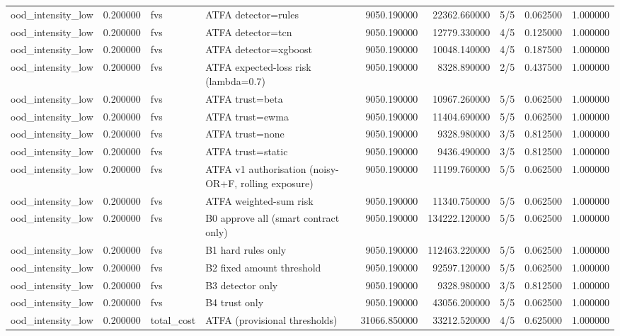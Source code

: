 \begin{tabular}{lrllrrlrr}
ood\_intensity\_low & 0.200000 & fvs & ATFA detector=rules & 9050.190000 & 22362.660000 & 5/5 & 0.062500 & 1.000000 \\
ood\_intensity\_low & 0.200000 & fvs & ATFA detector=tcn & 9050.190000 & 12779.330000 & 4/5 & 0.125000 & 1.000000 \\
ood\_intensity\_low & 0.200000 & fvs & ATFA detector=xgboost & 9050.190000 & 10048.140000 & 4/5 & 0.187500 & 1.000000 \\
ood\_intensity\_low & 0.200000 & fvs & ATFA expected-loss risk (lambda=0.7) & 9050.190000 & 8328.890000 & 2/5 & 0.437500 & 1.000000 \\
ood\_intensity\_low & 0.200000 & fvs & ATFA trust=beta & 9050.190000 & 10967.260000 & 5/5 & 0.062500 & 1.000000 \\
ood\_intensity\_low & 0.200000 & fvs & ATFA trust=ewma & 9050.190000 & 11404.690000 & 5/5 & 0.062500 & 1.000000 \\
ood\_intensity\_low & 0.200000 & fvs & ATFA trust=none & 9050.190000 & 9328.980000 & 3/5 & 0.812500 & 1.000000 \\
ood\_intensity\_low & 0.200000 & fvs & ATFA trust=static & 9050.190000 & 9436.490000 & 3/5 & 0.812500 & 1.000000 \\
ood\_intensity\_low & 0.200000 & fvs & ATFA v1 authorisation (noisy-OR+F, rolling exposure) & 9050.190000 & 11199.760000 & 5/5 & 0.062500 & 1.000000 \\
ood\_intensity\_low & 0.200000 & fvs & ATFA weighted-sum risk & 9050.190000 & 11340.750000 & 5/5 & 0.062500 & 1.000000 \\
ood\_intensity\_low & 0.200000 & fvs & B0 approve all (smart contract only) & 9050.190000 & 134222.120000 & 5/5 & 0.062500 & 1.000000 \\
ood\_intensity\_low & 0.200000 & fvs & B1 hard rules only & 9050.190000 & 112463.220000 & 5/5 & 0.062500 & 1.000000 \\
ood\_intensity\_low & 0.200000 & fvs & B2 fixed amount threshold & 9050.190000 & 92597.120000 & 5/5 & 0.062500 & 1.000000 \\
ood\_intensity\_low & 0.200000 & fvs & B3 detector only & 9050.190000 & 9328.980000 & 3/5 & 0.812500 & 1.000000 \\
ood\_intensity\_low & 0.200000 & fvs & B4 trust only & 9050.190000 & 43056.200000 & 5/5 & 0.062500 & 1.000000 \\
ood\_intensity\_low & 0.200000 & total\_cost & ATFA (provisional thresholds) & 31066.850000 & 33212.520000 & 4/5 & 0.625000 & 1.000000 \\

\end{tabular}

